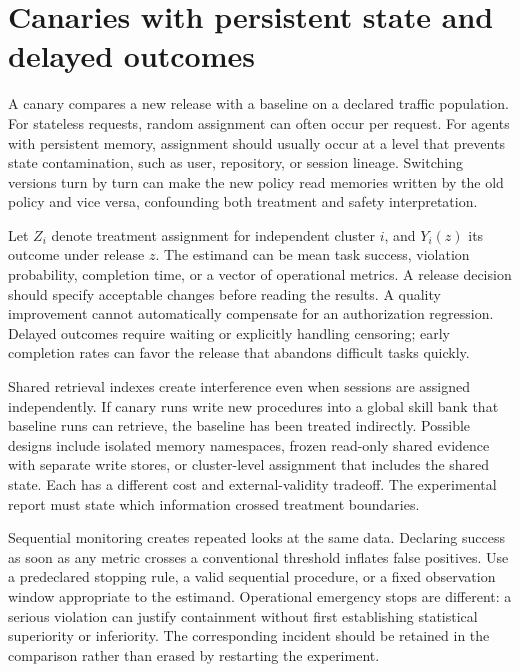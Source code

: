 \section{Canaries with persistent state and delayed outcomes}\label{sec:C32:03}
A canary compares a new release with a baseline on a declared traffic population. For stateless requests, random assignment can often occur per request. For agents with persistent memory, assignment should usually occur at a level that prevents state contamination, such as user, repository, or session lineage. Switching versions turn by turn can make the new policy read memories written by the old policy and vice versa, confounding both treatment and safety interpretation.

Let $Z_i$ denote treatment assignment for independent cluster $i$, and $Y_i(z)$ its outcome under release $z$. The estimand can be mean task success, violation probability, completion time, or a vector of operational metrics. A release decision should specify acceptable changes before reading the results. A quality improvement cannot automatically compensate for an authorization regression. Delayed outcomes require waiting or explicitly handling censoring; early completion rates can favor the release that abandons difficult tasks quickly.

Shared retrieval indexes create interference even when sessions are assigned independently. If canary runs write new procedures into a global skill bank that baseline runs can retrieve, the baseline has been treated indirectly. Possible designs include isolated memory namespaces, frozen read-only shared evidence with separate write stores, or cluster-level assignment that includes the shared state. Each has a different cost and external-validity tradeoff. The experimental report must state which information crossed treatment boundaries.

Sequential monitoring creates repeated looks at the same data. Declaring success as soon as any metric crosses a conventional threshold inflates false positives. Use a predeclared stopping rule, a valid sequential procedure, or a fixed observation window appropriate to the estimand. Operational emergency stops are different: a serious violation can justify containment without first establishing statistical superiority or inferiority. The corresponding incident should be retained in the comparison rather than erased by restarting the experiment.

